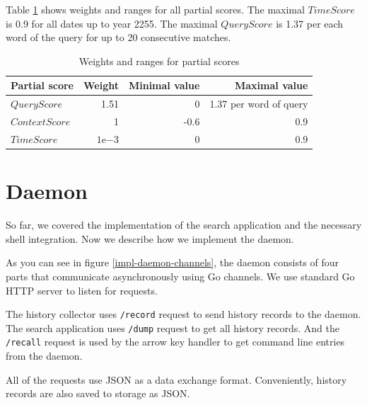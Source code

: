 Table \ref{tab:score-weights-ranges} shows weights and ranges for all partial scores. The maximal \(TimeScore\) is 0.9 for all dates up to year 2255. The maximal \(QueryScore\) is 1.37 per each word of the query for up to 20 consecutive matches. 


\begin{table}[h!]
\centering
\begin{tabular}{lrrr}
\hline \hline
Partial score & Weight & Minimal value & Maximal value \\
\hline
$QueryScore$ & 1.51 & 0 & 1.37 per word of query  \\ 
$ContextScore$ & 1 & -0.6 & 0.9 \\ 
$TimeScore$ & $1\mathrm{e}{-3}$ & 0 & 0.9 \\
\hline \hline
\end{tabular}
\caption{Weights and ranges for partial scores}
\label{tab:score-weights-ranges}
\end{table}

\newpage
\section{Daemon}

So far, we covered the implementation of the search application and the necessary shell integration. Now we describe how we implement the daemon.


As you can see in figure \ref{impl-daemon-channels}, the daemon consists of four parts that communicate asynchronously using Go channels\cite{lib-go-channels}. We use standard Go HTTP server\cite{lib-go-http} to listen for requests. 

The history collector uses \verb|/record| request to send history records to the daemon. The search application uses \verb|/dump| request to get all history records. And the \verb|/recall| request is used by the arrow key handler to get command line entries from the daemon. 

All of the requests use JSON as a data exchange format. Conveniently, history records are also saved to storage as JSON. 

